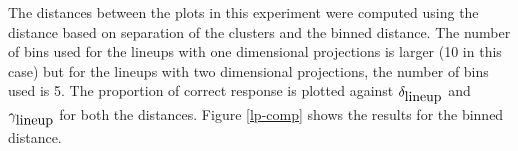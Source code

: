 \documentclass[12]{article}
\begin{document}
The distances between the plots in this experiment were computed using the distance based on separation of the clusters and the binned distance. The number of bins used for the lineups with one dimensional projections is larger (10 in this case) but for the lineups with two dimensional projections, the number of bins used is 5. The proportion of correct response is plotted against $\delta_{\hbox{lineup}}$ and $\gamma_{\hbox{lineup}}$ for both the distances. Figure \ref{lp-comp} shows the results for the binned distance.


\begin{figure}[hbtp]
\centering
{}
\end{figure}
\end{document}
